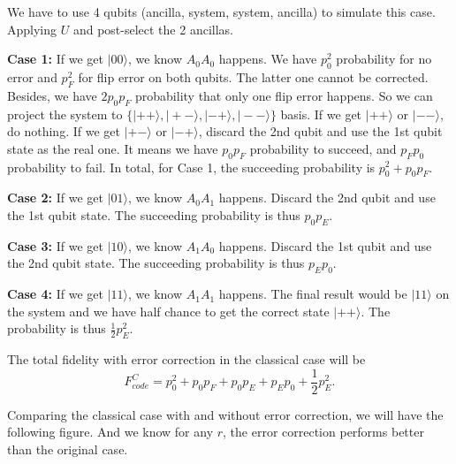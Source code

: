 \documentclass[prl,onecolumn]{revtex4-1}
\newcommand{\ket}[1]{|#1\rangle}
\newcommand{\be}{\begin{equation}}
\newcommand{\ee}{\end{equation}}
\begin{document}
We have to use 4 qubits (ancilla, system, system, ancilla) to simulate this case. Applying $U$ and post-select the 2 ancillas.

\textbf{Case 1:} If we get $\ket{00}$, we know $A_0A_0$ happens. We have $p_0^2$ probability for no error and $p_F^2$ for flip error on both qubits. The latter one cannot be corrected. Besides, we have $2p_0p_F$ probability that only one flip error happens. So we can project the system to $\{\ket{++}, \ket{+-}, \ket{-+}, \ket{--}\}$ basis. If we get $\ket{++}$ or $\ket{--}$, do nothing. If we get $\ket{+-}$ or $\ket{-+}$, discard the 2nd qubit and use the 1st qubit state as the real one. It means we have $p_0p_F$ probability to succeed, and $p_Fp_0$ probability to fail. In total, for Case 1, the succeeding probability is $p_0^2+p_0p_F$.

\textbf{Case 2:} If we get $\ket{01}$, we know $A_0A_1$ happens. Discard the 2nd qubit and use the 1st qubit state. The succeeding probability is thus $p_0p_E$.

\textbf{Case 3:} If we get $\ket{10}$, we know $A_1A_0$ happens. Discard the 1st qubit and use the 2nd qubit state. The succeeding probability is thus $p_Ep_0$.

\textbf{Case 4:} If we get $\ket{11}$, we know $A_1A_1$ happens. The final result would be $\ket{11}$ on the system and we have half chance to get the correct state $\ket{++}$. The probability is thus $\frac{1}{2}p_E^2$.

The total fidelity with error correction in the classical case will be 
\be
F^C_{code} = p_0^2+p_0p_F+p_0p_E+p_Ep_0+ \frac{1}{2}p_E^2.
\ee

Comparing the classical case with and without error correction, we will have the following figure. And we know for any $r$, the error correction performs better than the original case.
\end{document}
